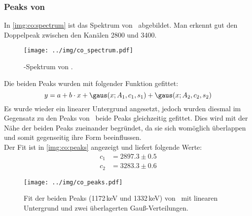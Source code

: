 \subsubsection{Peaks von \co}
\label{subsub:eval:co}
In \autoref{img:co:spectrum} ist das Spektrum von \co\, abgebildet. Man erkennt gut den Doppelpeak zwischen den Kanälen 2800 und 3400.
\begin{figure}[H]
\begin{center}
  \texttt{[image: ../img/co\_spectrum.pdf]}
  \caption{\textgamma-Spektrum von .}
  \label{img:co:spectrum}
\end{center}
\end{figure}
Die beiden Peaks wurden mit folgender Funktion gefittet:
\begin{equation}
  y = a + b\cdot x + \gaus(x; A_1, c_1, s_1) + \gaus(x; A_2, c_2, s_2)
\end{equation}
Es wurde wieder ein linearer Untergrund angesetzt, jedoch wurden diesmal im Gegensatz zu den Peaks von \na\, beide Peaks gleichzeitig gefittet. 
Dies wird mit der Nähe der beiden Peaks zueinander begründet, da sie sich womöglich überlappen und somit gegenseitig ihre Form beeinflussen.\\
Der Fit ist in \autoref{img:co:peaks} angezeigt und liefert folgende Werte:
\begin{equation}
\begin{split}
  \label{eq:co:channels}
  c_1 &= 2897.3 \pm 0.5 \\
  c_2 &= 3283.3 \pm 0.6
\end{split}
\end{equation}
\begin{figure}[H]
\begin{center}
  \texttt{[image: ../img/co\_peaks.pdf]}
  \caption{Fit der beiden Peaks (1172\,keV und 1332\,keV) von \co\,
  mit linearen Untergrund und zwei überlagerten Gauß-Verteilungen.}
  \label{img:co:peaks}
\end{center}
\end{figure}

